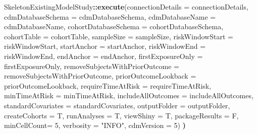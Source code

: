 \documentclass[
]{article}
\newenvironment{Shaded}{\begin{snugshade}}{\end{snugshade}}
\newcommand{\DataTypeTok}[1]{\textcolor[rgb]{0.13,0.29,0.53}{#1}}
\newcommand{\DecValTok}[1]{\textcolor[rgb]{0.00,0.00,0.81}{#1}}
\newcommand{\ErrorTok}[1]{\textcolor[rgb]{0.64,0.00,0.00}{\textbf{#1}}}
\newcommand{\KeywordTok}[1]{\textcolor[rgb]{0.13,0.29,0.53}{\textbf{#1}}}
\newcommand{\NormalTok}[1]{#1}
\newcommand{\OperatorTok}[1]{\textcolor[rgb]{0.81,0.36,0.00}{\textbf{#1}}}
\newcommand{\StringTok}[1]{\textcolor[rgb]{0.31,0.60,0.02}{#1}}
\begin{document}
\begin{Shaded}
\begin{Highlighting}[]
\NormalTok{  SkeletonExistingModelStudy}\OperatorTok{::}\KeywordTok{execute}\NormalTok{(}\DataTypeTok{connectionDetails =}\NormalTok{ connectionDetails,}
                                      \DataTypeTok{cdmDatabaseSchema =}\NormalTok{ cdmDatabaseSchema,}
                                      \DataTypeTok{cdmDatabaseName =}\NormalTok{ cdmDatabaseName,}
                                      \DataTypeTok{cohortDatabaseSchema =}\NormalTok{ cohortDatabaseSchema,}
                                      \DataTypeTok{cohortTable =}\NormalTok{ cohortTable,}
                                      \DataTypeTok{sampleSize =}\NormalTok{ sampleSize,}
                                      \DataTypeTok{riskWindowStart =}\NormalTok{ riskWindowStart,}
                                      \DataTypeTok{startAnchor =}\NormalTok{ startAnchor,}
                                      \DataTypeTok{riskWindowEnd =}\NormalTok{ riskWindowEnd,}
                                      \DataTypeTok{endAnchor =}\NormalTok{ endAnchor,}
                                      \DataTypeTok{firstExposureOnly =}\NormalTok{ firstExposureOnly,}
                                      \DataTypeTok{removeSubjectsWithPriorOutcome =}\NormalTok{ removeSubjectsWithPriorOutcome,}
                                      \DataTypeTok{priorOutcomeLookback =}\NormalTok{ priorOutcomeLookback,}
                                      \DataTypeTok{requireTimeAtRisk =}\NormalTok{ requireTimeAtRisk,}
                                      \DataTypeTok{minTimeAtRisk =}\NormalTok{ minTimeAtRisk,}
                                      \DataTypeTok{includeAllOutcomes =}\NormalTok{ includeAllOutcomes,}
                                      \DataTypeTok{standardCovariates =}\NormalTok{ standardCovariates,}
                                      \DataTypeTok{outputFolder =}\NormalTok{ outputFolder,}
                                      \DataTypeTok{createCohorts =}\NormalTok{ T,}
                                      \DataTypeTok{runAnalyses =}\NormalTok{ T,}
                                      \DataTypeTok{viewShiny =}\NormalTok{ T,}
                                      \DataTypeTok{packageResults =}\NormalTok{ F,}
                                      \DataTypeTok{minCellCount=} \DecValTok{5}\NormalTok{,}
                                      \DataTypeTok{verbosity =} \StringTok{"INFO"}\NormalTok{,}
                                      \DataTypeTok{cdmVersion =} \DecValTok{5}\NormalTok{)}
\ErrorTok{)}
\end{Highlighting}
\end{Shaded}
\end{document}
